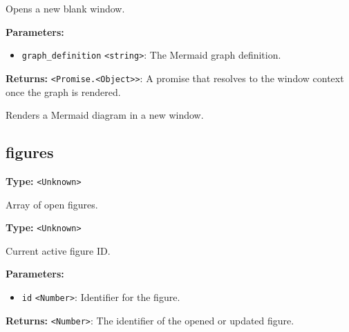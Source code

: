 \documentclass[12pt,a4paper]{article}
\begin{document}
\noindent Opens a new blank window.

\vspace{5mm}
\noindent {}


\noindent \textbf{Parameters:}
\begin{itemize}
  \item \texttt{graph\_definition} \texttt{<string>}: The Mermaid graph definition.
\end{itemize}

\noindent \textbf{Returns:} \texttt{<Promise.<Object>>}: A promise that resolves to the window context once the graph is rendered.

\noindent Renders a Mermaid diagram in a new window.


\subsection{figures}
\vspace{5mm}
\noindent {}\vspace{4mm}


\noindent \textbf{Type:} \texttt{<Unknown>}

\noindent Array of open figures.

\vspace{5mm}
\noindent {}\vspace{4mm}


\noindent \textbf{Type:} \texttt{<Unknown>}

\noindent Current active figure ID.

\vspace{5mm}
\noindent {}


\noindent \textbf{Parameters:}
\begin{itemize}
  \item \texttt{id} \texttt{<Number>}: Identifier for the figure.
\end{itemize}

\noindent \textbf{Returns:} \texttt{<Number>}: The identifier of the opened or updated figure.
\end{document}
